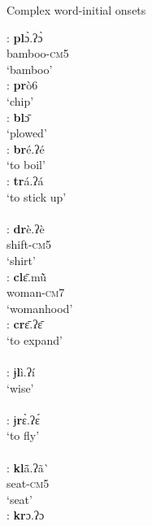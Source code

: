 \documentclass[output=paper]{langscibook}
\begin{document}
 \begin{exe}
    \ex Complex word-initial onsets \label{ex:traore:complexOnsetWordInitial:12}
    \nopagebreak
    \begin{multicols}{2}
    \begin{xlisti}
        \ex \glll [pl]: \textbf{pl}ɔ̀.ʔɔ̀ \\
            {}      bamboo-\textsc{cm}5\\
            {} ‘bamboo’\\ 
        \ex \gll [pr]: \textbf{pr}ò6\\
            {}  `chip'\\
        \ex \gll [bl]:        \textbf{bl}ɔ̄ \\
            {}      `plowed'\\
        \ex \gll [br]:      \textbf{br}é.ʔé \\
            {} {`to boil'}\\
        \ex \glll [tr]:        \textbf{tr}á.ʔá\\
            {}      {`to stick up'}\\
            {} {}\\
        \ex \glll [dr]:      \textbf{dr}è.ʔè \\
            {}      shift-\textsc{cm}5\\
            {}      `shirt'\\
        \ex \glll [cl]:       \textbf{cl}ɛ̄.mũ̀ \\
            {} woman-\textsc{cm}7\\
            {} `womanhood'\\
        \ex \glll [cr]:        \textbf{cr}ɛ̄.ʔɛ̄  \\
            {}          {`to expand'}\\
            {} {} \\
        \ex \glll [ɉl]:         ɉ\textbf{l}ì.ʔí\\
            {}          `wise'\\
            {} {} \\
        \ex  \glll [ɉr]:        ɉ\textbf{r}ɛ̀.ʔɛ́ \\
            {}          {`to fly'}\\
            {} {} \\
        \ex \glll [kl]:       \textbf{kl}ã\={}.ʔã\`{}~\\
            {} seat-\textsc{cm}5\\
            {} `seat'\\
        \ex \glll  [kr]:       \textbf{kr}ɔ.ʔɔ \\

\end{xlisti}
\end{multicols}
\end{exe}
\end{document}
